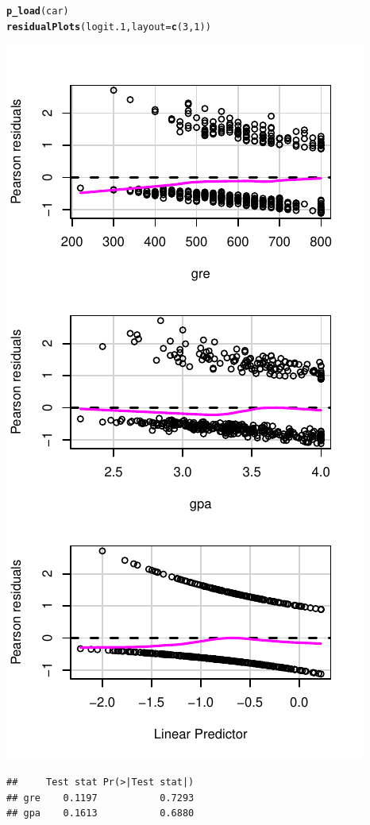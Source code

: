 \documentclass[onesided]{article}\usepackage[]{graphicx}\usepackage[]{color}
\makeatletter
\def\maxwidth{ %
  \ifdim\Gin@nat@width>\linewidth
    \linewidth
  \else
    \Gin@nat@width
  \fi
}
\newcommand{\hlnum}[1]{\textcolor[rgb]{0.686,0.059,0.569}{#1}}%
\newcommand{\hlstd}[1]{\textcolor[rgb]{0.345,0.345,0.345}{#1}}%
\newcommand{\hlkwc}[1]{\textcolor[rgb]{0.333,0.667,0.333}{#1}}%
\newcommand{\hlkwd}[1]{\textcolor[rgb]{0.737,0.353,0.396}{\textbf{#1}}}%
\newenvironment{kframe}{%
 \def\at@end@of@kframe{}%
 \ifinner\ifhmode%
  \def\at@end@of@kframe{\end{minipage}}%
  \begin{minipage}{\columnwidth}%
 \fi\fi%
 \def\FrameCommand##1{\hskip\@totalleftmargin \hskip-\fboxsep
 \colorbox{shadecolor}{##1}\hskip-\fboxsep
     \hskip-\linewidth \hskip-\@totalleftmargin \hskip\columnwidth}%
 \MakeFramed {\advance\hsize-\width
   \@totalleftmargin\z@ \linewidth\hsize
   \@setminipage}}%
 {\par\unskip\endMakeFramed%
 \at@end@of@kframe}
\newenvironment{knitrout}{}{} %
\makeatother
\begin{document}
\begin{knitrout}
\color{fgcolor}\begin{kframe}
\begin{alltt}
\hlkwd{p_load}\hlstd{(car)}
\hlkwd{residualPlots}\hlstd{(logit.1,} \hlkwc{layout}\hlstd{=}\hlkwd{c}\hlstd{(}\hlnum{3}\hlstd{,}\hlnum{1}\hlstd{))}
\end{alltt}
\end{kframe}

{\centering \includegraphics[width=\maxwidth]{figure/residual:plot-1} 

}


\begin{kframe}\begin{verbatim}
##     Test stat Pr(>|Test stat|)
## gre    0.1197           0.7293
## gpa    0.1613           0.6880
\end{verbatim}
\end{kframe}
\end{knitrout}
\end{document}
